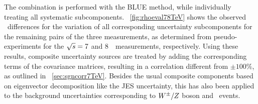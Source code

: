 The combination is performed with the \gls{BLUE} method, while individually treating all systematic subcomponents.
%
\Fig~\ref{fig:rhoeval78TeV} shows the observed \mt\ differences for the variation of all corresponding uncertainty subcomponents for the remaining pairs of the three measurements, as determined from pseudo-experiments for the ${\sqrt{s}}=7$ and $8$~\TeV\ measurements, respectively. 
%
%
Using these results, composite uncertainty sources are treated by adding the corresponding terms of the covariance matrices, resulting in a correlation different from $\pm 100\%$, as outlined in \sect~\ref{sec:sgncorr7TeV}. Besides the usual composite components based on eigenvector decomposition like the \gls{JES} uncertainty, this has also been applied to the background uncertainties corresponding to $W^{\pm}/Z$ boson and \fake\ events. 

